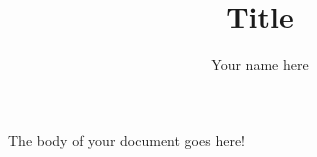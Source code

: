 \documentclass{article}
\title{Title}
\author{Your name here}
\begin{document}
\maketitle

The body of your document goes here!
\end{document}
